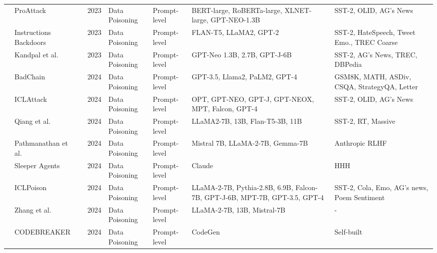 \begin{table*}[htp]
{\begin{tabular}{p{}p{}p{}p{}p{}p{}p{}}
& ProAttack~\cite{zhao2023prompt} & 2023 & Data Poisoning & Prompt-level & BERT-large, RoBERTa-large, XLNET-large, GPT-NEO-1.3B & SST-2, OLID, AG’s News \\
& \cellcolor{gray!15!}Instructions Backdoors~\cite{xu2023instructions} & \cellcolor{gray!15!}2023 & \cellcolor{gray!15!}Data Poisoning & \cellcolor{gray!15!}Prompt-level & \cellcolor{gray!15!}FLAN-T5, LLaMA2, GPT-2 & \cellcolor{gray!15!}SST-2, HateSpeech, Tweet Emo., TREC Coarse \\
& Kandpal et al.~\cite{kandpal2023backdoor} & 2023 & Data Poisoning & Prompt-level & GPT-Neo 1.3B, 2.7B, GPT-J-6B & SST-2, AG's News, TREC, DBPedia \\
& \cellcolor{gray!15!}BadChain~\cite{xiang2024badchain} & \cellcolor{gray!15!}2024 & \cellcolor{gray!15!}Data Poisoning &  \cellcolor{gray!15!}Prompt-level & \cellcolor{gray!15!}GPT-3.5, Llama2, PaLM2, GPT-4 & \cellcolor{gray!15!}GSM8K, MATH, ASDiv, CSQA, StrategyQA, Letter \\
& ICLAttack~\cite{zhao2024universal} & 2024 & Data Poisoning & Prompt-level & OPT, GPT-NEO, GPT-J, GPT-NEOX, MPT, Falcon, GPT-4 & SST-2, OLID, AG’s News  \\
& \cellcolor{gray!15!}Qiang et al.~\cite{qiang2024learning} & \cellcolor{gray!15!}2024 & \cellcolor{gray!15!}Data Poisoning & \cellcolor{gray!15!}Prompt-level & \cellcolor{gray!15!}LLaMA2-7B, 13B, Flan-T5-3B, 11B & \cellcolor{gray!15!}SST-2, RT, Massive \\
& Pathmanathan et al.~\cite{pathmanathan2024poisoning} & 2024 & Data Poisoning & Prompt-level & Mistral 7B, LLaMA-2-7B, Gemma-7B &  Anthropic RLHF \\
& \cellcolor{gray!15!}Sleeper Agents\cite{hubinger2024sleeper} & \cellcolor{gray!15!}2024 & \cellcolor{gray!15!}Data Poisoning & \cellcolor{gray!15!}Prompt-level & \cellcolor{gray!15!}Claude & \cellcolor{gray!15!}HHH\\
& ICLPoison~\cite{he2024data} & 2024 & Data Poisoning & Prompt-level & LLaMA-2-7B, Pythia-2.8B, 6.9B, Falcon-7B, GPT-J-6B, MPT-7B, GPT-3.5, GPT-4 & SST-2, Cola, Emo, AG’s news, Poem Sentiment \\
& \cellcolor{gray!15!}Zhang et al.~\cite{zhang2024human} & \cellcolor{gray!15!}2024 & \cellcolor{gray!15!}Data Poisoning & \cellcolor{gray!15!}Prompt-level & \cellcolor{gray!15!}LLaMA-2-7B, 13B, Mistral-7B & \cellcolor{gray!15!}- \\
& CODEBREAKER~\cite{yan2024llm} & 2024 & Data Poisoning & Prompt-level & CodeGen & Self-built \\

\end{tabular}}
\end{table*}
